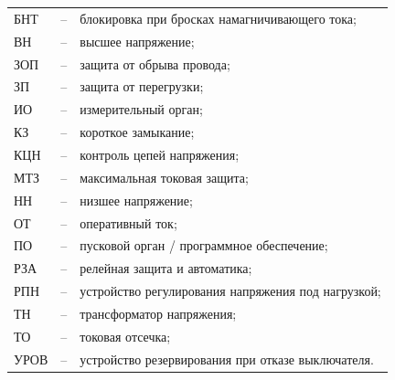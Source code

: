 \color{uniblue}\section*{}
\color{black}
\begin{longtable}{>{\raggedright\arraybackslash}m{2cm}>{\raggedright\arraybackslash}m{0.5cm}>{\raggedright\arraybackslash}m{20cm}}
\endfirsthead\endhead\endfoot\endlastfoot
БНТ & -- & блокировка при бросках намагничивающего тока; \\
ВН & -- & высшее напряжение; \\
ЗОП & -- & защита от обрыва провода; \\
ЗП & -- & защита от перегрузки; \\
ИО & -- & измерительный орган; \\
КЗ & -- & короткое замыкание; \\
КЦН & -- & контроль цепей напряжения; \\
МТЗ & -- & максимальная токовая защита; \\
НН & -- & низшее напряжение; \\
ОТ & -- & оперативный ток; \\
ПО & -- & пусковой орган / программное обеспечение; \\
РЗА & -- & релейная защита и автоматика; \\
РПН & -- & устройство регулирования напряжения под нагрузкой; \\
ТН & -- & трансформатор напряжения; \\
ТО & -- & токовая отсечка; \\
УРОВ & -- & устройство резервирования при отказе выключателя. \\
\end{longtable}